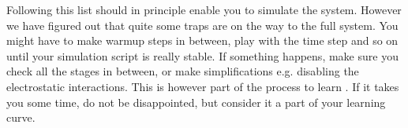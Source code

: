 Following this list should in principle enable you to simulate the system. However
we have figured out that quite some traps are on the way to the full system. You might
have to make warmup steps in between, play with the time step and so on until your
simulation script is really stable. If something happens, make sure you check all
the stages in between, or make simplifications e.g. disabling the electrostatic interactions.
This is however part of the process 
to learn \ES{}. If it takes you some time, do not be disappointed, but 
consider it a part of your learning curve.















